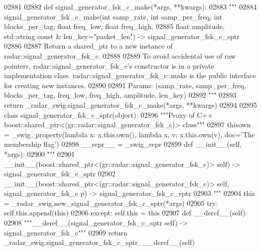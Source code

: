 \begin{DoxyCode}
{{{{{{{{{{{02881 
02882 \textcolor{keyword}{def }signal_generator_fsk_c_make(*args, **kwargs):
02883   \textcolor{stringliteral}{"""}
02884 \textcolor{stringliteral}{    signal\_generator\_fsk\_c\_make(int samp\_rate, int samp\_per\_freq, int blocks\_per\_tag, float freq\_low, float
       freq\_high, }
02885 \textcolor{stringliteral}{        float amplitude, std::string const & len\_key="packet\_len") -> signal\_generator\_fsk\_c\_sptr}
02886 \textcolor{stringliteral}{}
02887 \textcolor{stringliteral}{    Return a shared\_ptr to a new instance of radar::signal\_generator\_fsk\_c.}
02888 \textcolor{stringliteral}{}
02889 \textcolor{stringliteral}{    To avoid accidental use of raw pointers, radar::signal\_generator\_fsk\_c's constructor is in a private
       implementation class. radar::signal\_generator\_fsk\_c::make is the public interface for creating new instances.}
02890 \textcolor{stringliteral}{}
02891 \textcolor{stringliteral}{    Params: (samp\_rate, samp\_per\_freq, blocks\_per\_tag, freq\_low, freq\_high, amplitude, len\_key)}
02892 \textcolor{stringliteral}{    """}
02893   \textcolor{keywordflow}{return} \_radar\_swig.signal\_generator\_fsk\_c\_make(*args, **kwargs)
02894 
02895 \textcolor{keyword}{class }signal_generator_fsk_c_sptr(object):
02896     \textcolor{stringliteral}{"""Proxy of C++ boost::shared\_ptr<(gr::radar::signal\_generator\_fsk\_c)> class"""}
02897     thisown = _swig_property(\textcolor{keyword}{lambda} x: x.this.own(), \textcolor{keyword}{lambda} x, v: x.this.own(v), doc=\textcolor{stringliteral}{'The membership flag'})
02898     \_\_repr\_\_ = \_swig\_repr
02899     \textcolor{keyword}{def }__init__(self, *args): 
02900         \textcolor{stringliteral}{"""}
02901 \textcolor{stringliteral}{        \_\_init\_\_(boost::shared\_ptr<(gr::radar::signal\_generator\_fsk\_c)> self) ->
       signal\_generator\_fsk\_c\_sptr}
02902 \textcolor{stringliteral}{        \_\_init\_\_(boost::shared\_ptr<(gr::radar::signal\_generator\_fsk\_c)> self, signal\_generator\_fsk\_c p) ->
       signal\_generator\_fsk\_c\_sptr}
02903 \textcolor{stringliteral}{        """}
02904         this = \_radar\_swig.new\_signal\_generator\_fsk\_c\_sptr(*args)
02905         \textcolor{keywordflow}{try}: self.this.append(this)
02906         \textcolor{keywordflow}{except}: self.this = this
02907     \textcolor{keyword}{def }__deref__(self):
02908         \textcolor{stringliteral}{"""\_\_deref\_\_(signal\_generator\_fsk\_c\_sptr self) -> signal\_generator\_fsk\_c"""}
02909         \textcolor{keywordflow}{return} \_radar\_swig.signal\_generator\_fsk\_c\_sptr\_\_\_deref\_\_(self)
}}}}}}}}}}}
\end{DoxyCode}

